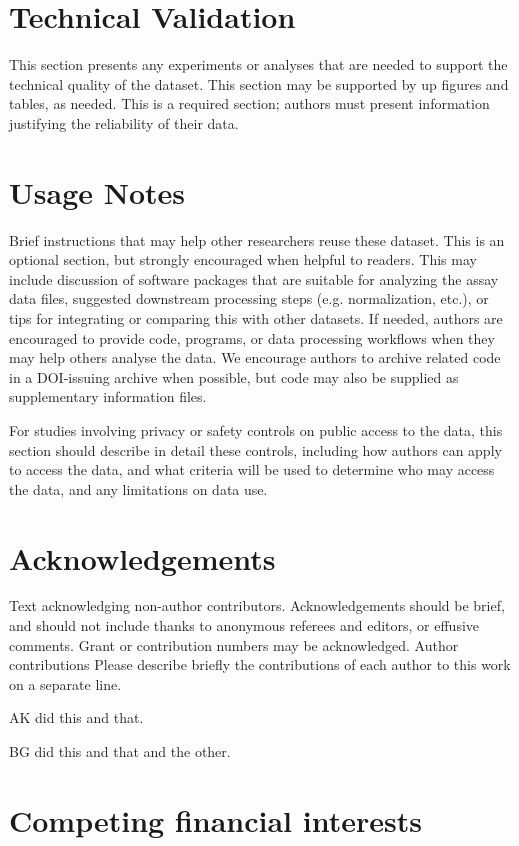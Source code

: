 \documentclass[english]{article}
\begin{document}
\section*{Technical Validation}

This section presents any experiments or analyses that are needed
to support the technical quality of the dataset. This section may
be supported by up figures and tables, as needed. This is a required
section; authors must present information justifying the reliability
of their data.


\section*{Usage Notes}

Brief instructions that may help other researchers reuse these dataset.
This is an optional section, but strongly encouraged when helpful
to readers. This may include discussion of software packages that
are suitable for analyzing the assay data files, suggested downstream
processing steps (e.g. normalization, etc.), or tips for integrating
or comparing this with other datasets. If needed, authors are encouraged
to provide code, programs, or data processing workflows when they may help 
others analyse the data. We encourage authors to archive related code in 
a DOI-issuing archive when possible, but code may also be supplied as 
supplementary information files. 

For studies involving privacy or safety controls on public access
to the data, this section should describe in detail these controls,
including how authors can apply to access the data, and what criteria
will be used to determine who may access the data, and any limitations
on data use. 


\section*{Acknowledgements}

Text acknowledging non-author contributors. Acknowledgements should
be brief, and should not include thanks to anonymous referees and
editors, or effusive comments. Grant or contribution numbers may be
acknowledged. Author contributions Please describe briefly the contributions
of each author to this work on a separate line. 

AK did this and that. 

BG did this and that and the other. 


\section*{Competing financial interests}
\end{document}
